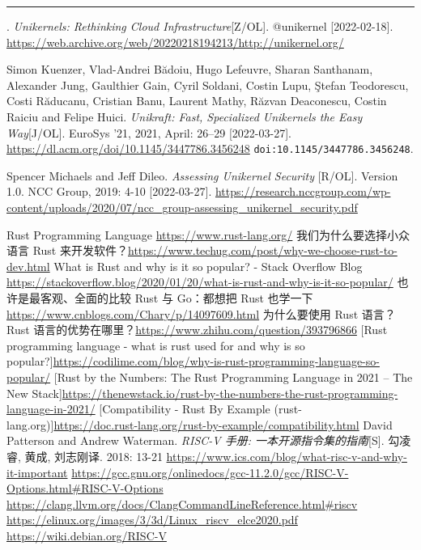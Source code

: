 \documentclass[UTF8,fontset=none,linespread=1.15]{ctexart}
\begin{document}
\begin{thebibliography}{99}
 \rule[0.5ex]{2em}{0.4pt}.
\textit{Unikernels: Rethinking Cloud Infrastructure}[Z/OL].
@unikernel [2022-02-18]. \url{https://web.archive.org/web/20220218194213/http://unikernel.org/}

 Simon Kuenzer, Vlad-Andrei Bădoiu, Hugo Lefeuvre, Sharan Santhanam,
Alexander Jung, Gaulthier Gain, Cyril Soldani, Costin Lupu, \c{S}tefan Teodorescu, Costi Răducanu,
Cristian Banu, Laurent Mathy, Răzvan Deaconescu, Costin Raiciu and Felipe Huici.
\textit{Unikraft: Fast, Specialized Unikernels the Easy Way}[J/OL]. EuroSys '21, 2021, April: 26–29
[2022-03-27]. \url{https://dl.acm.org/doi/10.1145/3447786.3456248} \texttt{doi:10.1145/3447786.3456248}.

 Spencer Michaels and Jeff Dileo. \textit{Assessing Unikernel Security
}[R/OL]. Version 1.0. NCC Group, 2019: 4-10 [2022-03-27].
\url{https://research.nccgroup.com/wp-content/uploads/2020/07/ncc_group-assessing_unikernel_security.pdf}

 Rust Programming Language \url{https://www.rust-lang.org/}
 我们为什么要选择小众语言 Rust 来开发软件？\url{https://www.techug.com/post/why-we-choose-rust-to-dev.html}
 What is Rust and why is it so popular? - Stack Overflow Blog \url{https://stackoverflow.blog/2020/01/20/what-is-rust-and-why-is-it-so-popular/}
 也许是最客观、全面的比较 Rust 与 Go：都想把 Rust 也学一下\url{https://www.cnblogs.com/Chary/p/14097609.html}
 为什么要使用 Rust 语言？Rust 语言的优势在哪里？\url{https://www.zhihu.com/question/393796866}
 [Rust programming language - what is rust used for and why is so popular?]\url{https://codilime.com/blog/why-is-rust-programming-language-so-popular/}
 [Rust by the Numbers: The Rust Programming Language in 2021 – The New Stack]\url{https://thenewstack.io/rust-by-the-numbers-the-rust-programming-language-in-2021/}
 [Compatibility - Rust By Example (rust-lang.org)]\url{https://doc.rust-lang.org/rust-by-example/compatibility.html}
 David Patterson and Andrew Waterman. \textit{RISC-V 手册: 一本开源指令集的指南}[S]. 勾凌睿, 黄成, 刘志刚译. 2018: 13-21
 \url{https://www.ics.com/blog/what-risc-v-and-why-it-important}
 \url{https://gcc.gnu.org/onlinedocs/gcc-11.2.0/gcc/RISC-V-Options.html#RISC-V-Options}
 \url{https://clang.llvm.org/docs/ClangCommandLineReference.html#riscv}
 \url{https://elinux.org/images/3/3d/Linux_riscv_elce2020.pdf}
 \url{https://wiki.debian.org/RISC-V}


\end{thebibliography}
\end{document}
